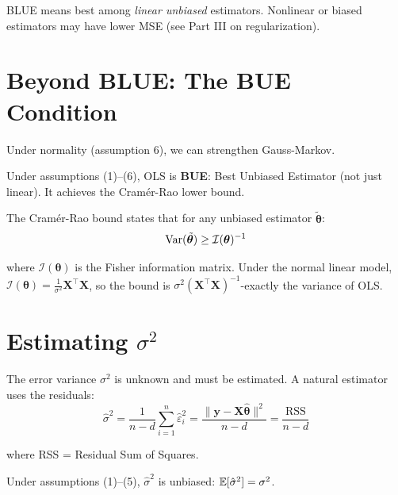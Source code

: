 \documentclass[main.tex]{subfiles}
\begin{document}
\begin{remark}
BLUE means best among \textit{linear unbiased} estimators. Nonlinear or biased estimators may have lower MSE (see Part III on regularization).
\end{remark}

\needspace{0.33\textheight}
\section{Beyond BLUE: The BUE Condition}

Under normality (assumption 6), we can strengthen Gauss-Markov.

\begin{theorem}
Under assumptions (1)--(6), OLS is \textbf{BUE}: Best Unbiased Estimator (not just linear). It achieves the Cramér-Rao lower bound.
\end{theorem}

The Cramér-Rao bound states that for any unbiased estimator $\tilde{\boldsymbol{\theta}}$:
$$\text{Var}(\tilde{\boldsymbol{\theta}}) \geq \mathcal{I}(\boldsymbol{\theta})^{-1}$$

where $\mathcal{I}(\boldsymbol{\theta})$ is the Fisher information matrix. Under the normal linear model, $\mathcal{I}(\boldsymbol{\theta}) = \frac{1}{\sigma^2}\mathbf{X}^\top\mathbf{X}$, so the bound is $\sigma^2(\mathbf{X}^\top\mathbf{X})^{-1}$-exactly the variance of OLS.

\needspace{0.33\textheight}
\section{Estimating $\sigma^2$}

The error variance $\sigma^2$ is unknown and must be estimated. A natural estimator uses the residuals:
$$\hat{\sigma}^2 = \frac{1}{n-d}\sum_{i=1}^{n}\hat{\varepsilon}_i^2 = \frac{\|\mathbf{y} - \mathbf{X}\hat{\boldsymbol{\theta}}\|^2}{n-d} = \frac{\text{RSS}}{n-d}$$

where RSS = Residual Sum of Squares.

\begin{theorem}
Under assumptions (1)--(5), $\hat{\sigma}^2$ is unbiased: $\mathbb{E}[\hat{\sigma}^2] = \sigma^2$.
\end{theorem}
\end{document}
